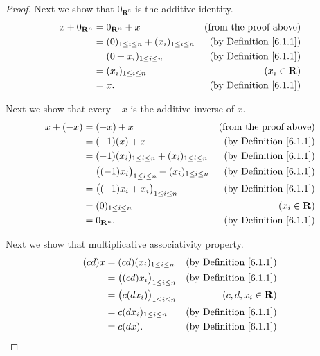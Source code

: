 \begin{proof}
    Next we show that \(0_{\mathbf{R}^n}\) is the additive identity.
    \begin{align*}
        x + 0_{\mathbf{R}^n} & = 0_{\mathbf{R}^n} + x                            & \text{(from the proof above)}      \\
                             & = (0)_{1 \leq i \leq n} + (x_i)_{1 \leq i \leq n} & \text{(by Definition \ref{6.1.1})} \\
                             & = (0 + x_i)_{1 \leq i \leq n}                     & \text{(by Definition \ref{6.1.1})} \\
                             & = (x_i)_{1 \leq i \leq n}                         & (x_i \in \mathbf{R})               \\
                             & = x.                                              & \text{(by Definition \ref{6.1.1})}
    \end{align*}

    Next we show that every \(-x\) is the additive inverse of \(x\).
    \begin{align*}
        x + (-x) & = (-x) + x                                                      & \text{(from the proof above)}      \\
                 & = (-1)(x) + x                                                   & \text{(by Definition \ref{6.1.1})} \\
                 & = (-1)(x_i)_{1 \leq i \leq n} + (x_i)_{1 \leq i \leq n}         & \text{(by Definition \ref{6.1.1})} \\
                 & = \big((-1)x_i\big)_{1 \leq i \leq n} + (x_i)_{1 \leq i \leq n} & \text{(by Definition \ref{6.1.1})} \\
                 & = \big((-1)x_i + x_i\big)_{1 \leq i \leq n}                     & \text{(by Definition \ref{6.1.1})} \\
                 & = (0)_{1 \leq i \leq n}                                         & (x_i \in \mathbf{R})               \\
                 & = 0_{\mathbf{R}^n}.                                             & \text{(by Definition \ref{6.1.1})}
    \end{align*}

    Next we show that multiplicative associativity property.
    \begin{align*}
        (cd)x & = (cd)(x_i)_{1 \leq i \leq n}          & \text{(by Definition \ref{6.1.1})} \\
              & = \big((cd) x_i\big)_{1 \leq i \leq n} & \text{(by Definition \ref{6.1.1})} \\
              & = \big(c(d x_i)\big)_{1 \leq i \leq n} & (c, d, x_i \in \mathbf{R})         \\
              & = c(d x_i)_{1 \leq i \leq n}           & \text{(by Definition \ref{6.1.1})} \\
              & = c(dx).                               & \text{(by Definition \ref{6.1.1})}
    \end{align*}


\end{proof}
